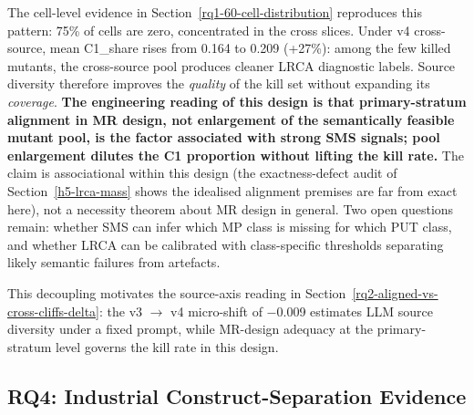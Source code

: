 \documentclass[manuscript,screen,review]{acmart}
\begin{document}
The cell-level evidence in Section~\ref{rq1-60-cell-distribution} reproduces this pattern: 75\% of cells
are zero, concentrated in the cross slices. Under v4 cross-source, mean
C1\_share rises from 0.164 to 0.209 (+27\%): among the few killed
mutants, the cross-source pool produces cleaner LRCA diagnostic labels.
Source diversity therefore improves the \emph{quality} of the kill set
without expanding its \emph{coverage}. \textbf{The engineering reading of
this design is that primary-stratum alignment in MR design, not
enlargement of the semantically feasible mutant pool, is the factor
associated with strong SMS signals; pool enlargement dilutes the C1
proportion without lifting the kill rate.} The claim is associational
within this design (the exactness-defect audit of
Section~\ref{h5-lrca-mass} shows the idealised alignment premises are
far from exact here), not a necessity theorem about MR design in
general. Two open questions remain:
whether SMS can infer which MP class is missing for which PUT class, and
whether LRCA can be calibrated with class-specific thresholds separating
likely semantic failures from artefacts.

This decoupling motivates the source-axis reading in Section~\ref{rq2-aligned-vs-cross-cliffs-delta}: the v3 $\to$
v4 micro-shift of $-$0.009 estimates LLM source diversity under a fixed
prompt, while MR-design adequacy at the primary-stratum level governs the
kill rate in this design.

\subsection{RQ4: Industrial Construct-Separation Evidence}\label{rq4-industrial-construct-separation}
\end{document}
